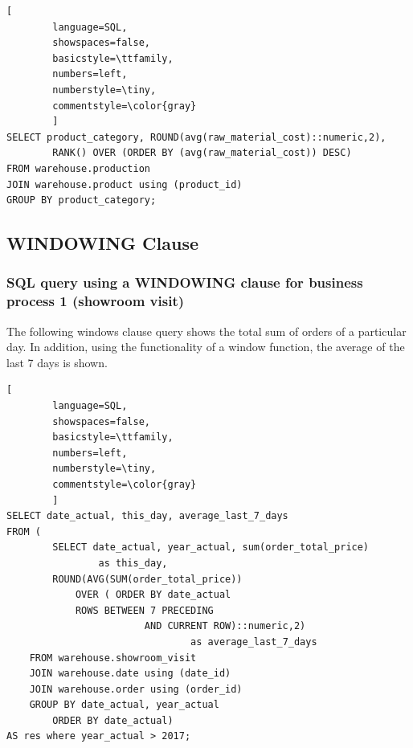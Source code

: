 \documentclass[letterpaper,12pt]{article}
\begin{document}
\begin{lstlisting}[
        language=SQL,
        showspaces=false,
        basicstyle=\ttfamily,
        numbers=left,
        numberstyle=\tiny,
        commentstyle=\color{gray}
        ]
SELECT product_category, ROUND(avg(raw_material_cost)::numeric,2),
        RANK() OVER (ORDER BY (avg(raw_material_cost)) DESC)
FROM warehouse.production
JOIN warehouse.product using (product_id)
GROUP BY product_category;
\end{lstlisting}
                
\subsection{WINDOWING Clause}

\subsubsection{SQL query using a WINDOWING clause for business process 1 (showroom visit)}

The following windows clause query shows the total sum of orders of a particular day. In addition, using the functionality of a window function, the average of the last 7 days is shown.

\begin{lstlisting}[
        language=SQL,
        showspaces=false,
        basicstyle=\ttfamily,
        numbers=left,
        numberstyle=\tiny,
        commentstyle=\color{gray}
        ]																			   
SELECT date_actual, this_day, average_last_7_days	
FROM (
        SELECT date_actual, year_actual, sum(order_total_price) 
                as this_day, 
		ROUND(AVG(SUM(order_total_price))
			OVER ( ORDER BY date_actual
			ROWS BETWEEN 7 PRECEDING
                        AND CURRENT ROW)::numeric,2) 
                                as average_last_7_days
	FROM warehouse.showroom_visit
	JOIN warehouse.date using (date_id)
	JOIN warehouse.order using (order_id)
	GROUP BY date_actual, year_actual
        ORDER BY date_actual) 
AS res where year_actual > 2017;
\end{lstlisting}				  
\end{document}
